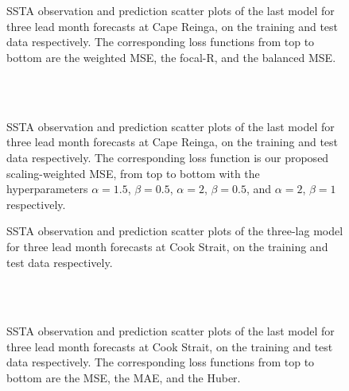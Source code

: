 \documentclass[11pt, a4paper]{article}
\begin{document}
\begin{figure}[H]
\centering
{}
\\
\\
\caption{SSTA observation and prediction scatter plots of the last model for three lead month forecasts at Cape Reinga, on the training and test data respectively. The corresponding loss functions from top to bottom are the weighted MSE, the focal-R, and the balanced MSE.}
\end{figure}

\begin{figure}[H]
\centering
{}
\\
\\
\caption{SSTA observation and prediction scatter plots of the last model for three lead month forecasts at Cape Reinga, on the training and test data respectively. The corresponding loss function is our proposed scaling-weighted MSE, from top to bottom with the hyperparameters $\alpha=1.5$, $\beta=0.5$, $\alpha=2$, $\beta=0.5$, and $\alpha=2$, $\beta=1$ respectively.}
\end{figure}

\begin{figure}[H]
\centering
{}
\caption{SSTA observation and prediction scatter plots of the three-lag model for three lead month forecasts at Cook Strait, on the training and test data respectively.}
\end{figure}

\begin{figure}[H]
\centering
{}
\\
\\
\caption{SSTA observation and prediction scatter plots of the last model for three lead month forecasts at Cook Strait, on the training and test data respectively. The corresponding loss functions from top to bottom are the MSE, the MAE, and the Huber.}
\end{figure}
\end{document}
